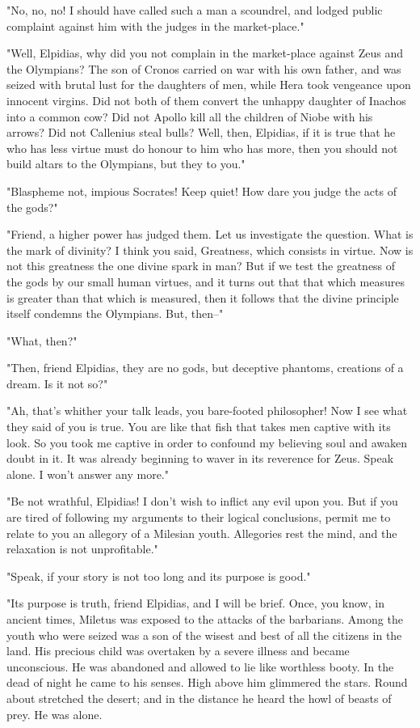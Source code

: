 "No, no, no! I should have called such a man a scoundrel, and lodged
public complaint against him with the judges in the market-place."

"Well, Elpidias, why did you not complain in the market-place against
Zeus and the Olympians? The son of Cronos carried on war with his own
father, and was seized with brutal lust for the daughters of men,
while Hera took vengeance upon innocent virgins. Did not both of them
convert the unhappy daughter of Inachos into a common cow? Did not
Apollo kill all the children of Niobe with his arrows? Did not
Callenius steal bulls? Well, then, Elpidias, if it is true that he who
has less virtue must do honour to him who has more, then you should
not build altars to the Olympians, but they to you."

"Blaspheme not, impious Socrates! Keep quiet! How dare you judge the
acts of the gods?"

"Friend, a higher power has judged them. Let us investigate the
question. What is the mark of divinity? I think you said, Greatness,
which consists in virtue. Now is not this greatness the one divine
spark in man? But if we test the greatness of the gods by our small
human virtues, and it turns out that that which measures is greater
than that which is measured, then it follows that the divine principle
itself condemns the Olympians. But, then--"

"What, then?"

"Then, friend Elpidias, they are no gods, but deceptive phantoms,
creations of a dream. Is it not so?"

"Ah, that's whither your talk leads, you bare-footed philosopher! Now
I see what they said of you is true. You are like that fish that takes
men captive with its look. So you took me captive in order to confound
my believing soul and awaken doubt in it. It was already beginning to
waver in its reverence for Zeus. Speak alone. I won't answer any
more."

"Be not wrathful, Elpidias! I don't wish to inflict any evil upon you.
But if you are tired of following my arguments to their logical
conclusions, permit me to relate to you an allegory of a Milesian
youth. Allegories rest the mind, and the relaxation is not
unprofitable."

"Speak, if your story is not too long and its purpose is good."

"Its purpose is truth, friend Elpidias, and I will be brief. Once, you
know, in ancient times, Miletus was exposed to the attacks of the
barbarians. Among the youth who were seized was a son of the wisest
and best of all the citizens in the land. His precious child was
overtaken by a severe illness and became unconscious. He was abandoned
and allowed to lie like worthless booty. In the dead of night he came
to his senses. High above him glimmered the stars. Round about
stretched the desert; and in the distance he heard the howl of beasts
of prey. He was alone.

